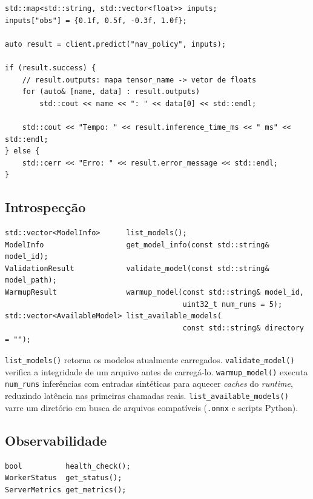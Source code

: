 \begin{lstlisting}[style=vscode]
std::map<std::string, std::vector<float>> inputs;
inputs["obs"] = {0.1f, 0.5f, -0.3f, 1.0f};

auto result = client.predict("nav_policy", inputs);

if (result.success) {
    // result.outputs: mapa tensor_name -> vetor de floats
    for (auto& [name, data] : result.outputs)
        std::cout << name << ": " << data[0] << std::endl;

    std::cout << "Tempo: " << result.inference_time_ms << " ms" << std::endl;
} else {
    std::cerr << "Erro: " << result.error_message << std::endl;
}
\end{lstlisting}

\subsection{Introspecção}

\begin{lstlisting}[style=vscode]
std::vector<ModelInfo>      list_models();
ModelInfo                   get_model_info(const std::string& model_id);
ValidationResult            validate_model(const std::string& model_path);
WarmupResult                warmup_model(const std::string& model_id,
                                         uint32_t num_runs = 5);
std::vector<AvailableModel> list_available_models(
                                         const std::string& directory = "");
\end{lstlisting}

\texttt{list\_models()} retorna os modelos atualmente carregados. \texttt{validate\_model()} verifica a integridade de um arquivo antes de carregá-lo. \texttt{warmup\_model()} executa \texttt{num\_runs} inferências com entradas sintéticas para aquecer \textit{caches} do \textit{runtime}, reduzindo latência nas primeiras chamadas reais. \texttt{list\_available\_models()} varre um diretório em busca de arquivos compatíveis (\texttt{.onnx} e scripts Python).

\subsection{Observabilidade}

\begin{lstlisting}[style=vscode]
bool          health_check();
WorkerStatus  get_status();
ServerMetrics get_metrics();
\end{lstlisting}


